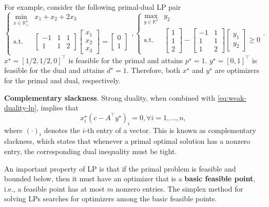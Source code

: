 \documentclass[
]{book}
\theoremstyle{definition}
\theoremstyle{definition}
\theoremstyle{definition}
\theoremstyle{definition}
\theoremstyle{remark}
\begin{document}
For example, consider the following primal-dual LP pair
\begin{equation}
\begin{cases}
\min_{x \in \mathbb{R}^{3}_{+}} & x_1 + x_2 + 2 x_3 \\
\mathrm{s.t.}& \begin{bmatrix} -1 & 1 & 1 \\ 1 & 1 & 2 \end{bmatrix} \begin{bmatrix} x_1 \\ x_2 \\ x_3 \end{bmatrix} = \begin{bmatrix} 0 \\ 1 \end{bmatrix}
\end{cases},
\begin{cases}
\max_{y \in \mathbb{R}^{2}} & y_2 \\
\mathrm{s.t.}& \begin{bmatrix} 1 \\ 1 \\ 2 \end{bmatrix} - \begin{bmatrix} -1 & 1 \\ 1 & 1 \\ 1 & 2 \end{bmatrix} \begin{bmatrix} y_1 \\ y_2 \end{bmatrix} \geq 0
\end{cases}.
\end{equation}
\(x^\star = [1/2,1/2,0]^\top\) is feasible for the primal and attains \(p^\star = 1\). \(y^\star = [0,1]^\top\) is feasible for the dual and attains \(d^\star = 1\). Therefore, both \(x^\star\) and \(y^\star\) are optimizers for the primal and dual, respectively.

\textbf{Complementary slackness}. Strong duality, when combined with \eqref{eq:weak-duality-lp}, implies that
\[
x_i^\star (c - A^\top y^\star)_i = 0, \forall i = 1,\dots,n,
\]
where \((\cdot)_i\) denotes the \(i\)-th entry of a vector. This is known as complementary slackness, which states that whenever a primal optimal solution has a nonzero entry, the corresponding dual inequality must be tight.

An important property of LP is that if the primal problem is feasible and bounded below, then it must have an optimizer that is a \textbf{basic feasible point}, i.e., a feasible point has at most \(m\) nonzero entries. The simplex method \citep{bertsimas97book-lp} for solving LPs searches for optimizers among the basic feasible points.
\end{document}

